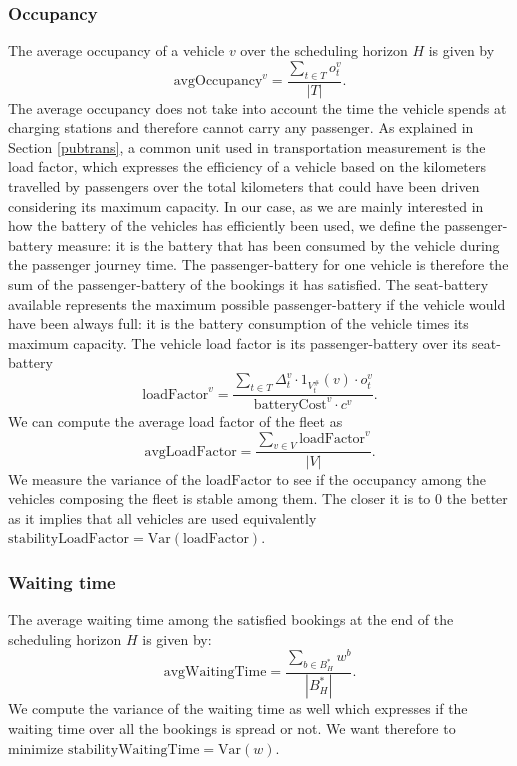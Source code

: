 \documentclass[12pt,a4paper]{article}
\begin{document}
\subsubsection{Occupancy}
The average occupancy of a vehicle $v$ over the scheduling horizon $H$ is given by
$$\text{avgOccupancy}^{v} = \frac{\sum_{t \in T}o^{v}_{t}}{|T|}.$$
The average occupancy does not take into account the time the vehicle spends at charging stations and therefore cannot carry any passenger. As explained in Section \ref{pubtrans}, a common unit used in transportation  measurement is the load factor, which expresses the efficiency of a vehicle based on the kilometers travelled by passengers over the total kilometers that could have been driven considering its maximum capacity. In our case, as we are mainly interested in how the battery of the vehicles has efficiently been used, we define the passenger-battery measure: it is the battery that has been consumed by the vehicle during the passenger journey time. The passenger-battery for one vehicle is therefore the sum of the passenger-battery of the bookings it has satisfied. The seat-battery available represents the maximum possible passenger-battery if the vehicle would have been always full: it is the battery consumption of the vehicle times its maximum capacity. The vehicle load factor is its passenger-battery over its seat-battery
$$\text{loadFactor}^{v} = \frac{\sum_{t \in T} \Delta^{v}_{t} \cdot 1_{V^{\#}_{t}}(v) \cdot o^{v}_{t}}{\text{batteryCost}^{v} \cdot c^{v}}.$$
We can compute the average load factor of the fleet as
$$\text{avgLoadFactor} = \frac{\sum_{v \in V}\text{loadFactor}^{v}}{|V|}.$$
We measure the variance of the $\text{loadFactor}$ to see if the occupancy among the vehicles composing the fleet is stable among them. The closer it is to 0 the better as it implies that all vehicles are used equivalently $\text{stabilityLoadFactor} = \text{Var}(\text{loadFactor}).$
\subsubsection{Waiting time}
The average waiting time among the satisfied bookings at the end of the scheduling horizon $H$ is given by:
$$\text{avgWaitingTime} = \frac{\sum_{b \in B^{*}_{H}}w^{b}}{|B^{*}_{H}|}.$$
We compute the variance of the waiting time as well which expresses if the waiting time over all the bookings is spread or not. We want therefore to minimize $\text{stabilityWaitingTime} = \text{Var}(w)$.
\end{document}
